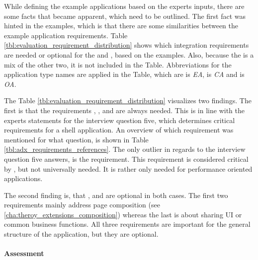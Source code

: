 While defining the example applications based on the experts inputs, there are some facts that became apparent, which need to be outlined.
The first fact was hinted in the examples, which is that there are some similarities between the example application requirements.
Table \ref{tbl:evaluation_requirement_distribution} shows which integration requirements are needed or optional for the  and , based on the examples.
Also, because the  is a mix of the other two, it is not included in the Table.
Abbreviations for the application type names are applied in the Table, which are  is \textit{EA},  is \textit{CA} and  is \textit{OA}.

The Table \ref{tbl:evaluation_requirement_distribution} visualizes two findings.
The first is that the requirements , ,  and  are always needed.
This is in line with the experts statements for the interview question five, which determines critical requirements for a shell application.
An overview of which requirement was mentioned for what question, is shown in Table \ref{tbl:adx_requirements_references}.
The only outlier in regards to the interview question five answers, is the  requirement.
This requirement is considered critical by \textciteRehm{}, but not universally needed.
It is rather only needed for performance oriented applications.

The second finding is, that ,  and  are optional in both cases.
The first two requirements mainly address page composition (see \ref{cha:theroy_extensions_composition}) whereas the last is about sharing \ac{UI} or common business functions.
All three requirements are important for the general structure of the application, but they are optional.



\paragraph{Assessment}

